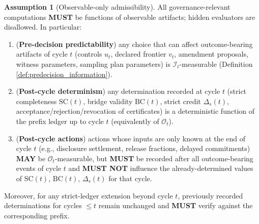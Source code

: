 \documentclass[11pt,a4paper]{article}
\newcommand{\MUST}{\textbf{MUST}}
\newcommand{\MUSTNOT}{\textbf{MUST NOT}}
\newcommand{\MAY}{\textbf{MAY}}
\newcommand{\cI}{\mathcal{I}}
\newcommand{\cO}{\mathcal{O}}
\theoremstyle{definition}
\newtheorem{assumption}{Assumption}
\theoremstyle{remark}
\begin{document}
\begin{assumption}[Observable-only admissibility]\label{ass:obs}
All governance-relevant computations \MUST{} be functions of observable artifacts; hidden evaluators are disallowed.
In particular:
\begin{enumerate}
\item (\textbf{Pre-decision predictability}) any choice that can affect outcome-bearing artifacts of cycle $t$ (controls $u_t$, declared frontier $v_t$, amendment proposals, witness parameters, sampling plan parameters) is $\cI_t$-measurable (Definition \ref{def:predecision_information}).
\item (\textbf{Post-cycle determinism}) any determination recorded at cycle $t$ (strict completeness $\mathrm{SC}(t)$, bridge validity $\mathrm{BC}(t)$, strict credit $\Delta_s(t)$, acceptance/rejection/revocation of certificates) is a deterministic function of the prefix ledger up to cycle $t$ (equivalently of $\cO_t$).
\item (\textbf{Post-cycle actions}) actions whose inputs are only known at the end of cycle $t$ (e.g., disclosure settlement, release fractions, delayed commitments) \MAY{} be $\cO_t$-measurable, but \MUST{} be recorded after all outcome-bearing events of cycle $t$ and \MUSTNOT{} influence the already-determined values of $\mathrm{SC}(t)$, $\mathrm{BC}(t)$, $\Delta_s(t)$ for that cycle.
\end{enumerate}
Moreover, for any strict-ledger extension beyond cycle $t$, previously recorded determinations for cycles $\le t$ remain unchanged and \MUST{} verify against the corresponding prefix.
\end{assumption}
\end{document}
